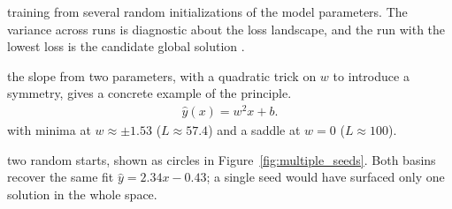 
 training from several random initializations 
of the model parameters. The variance across runs is diagnostic about the loss landscape, 
and the run with the lowest loss is the candidate global solution \cite{picard2021seed}. 

 the slope from two parameters, with a quadratic trick on $w$ to 
introduce a symmetry, gives a concrete example of the principle.
\begin{align*}
    \hat{y}(x) = w^2 x + b.
\end{align*}
with minima at $w \approx \pm 1.53$ ($L \approx 57.4$) and a saddle at $w = 0$ ($L \approx 100$).


 two random starts, shown as circles in Figure~\ref{fig:multiple_seeds}.
Both basins recover the same fit $\hat{y} = 2.34 x - 0.43$;
a single seed would have surfaced only one solution in the whole space.

\vspace{1.5em}



